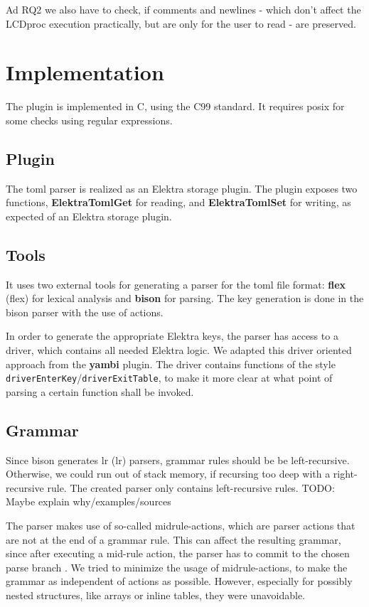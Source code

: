 \documentclass[draft,final]{vutinfth} %
\begin{document}
Ad RQ2 we also have to check, if comments and newlines - which don't affect the LCDproc execution practically, but are only for the user to read - are preserved.

\chapter{Implementation}

The plugin is implemented in C, using the C99 standard. It requires \acrshort{posix} for some checks using regular expressions.

\section{Plugin}
The \acrshort{toml} parser is realized as an Elektra storage plugin. The plugin exposes two functions, \textbf{ElektraTomlGet} for reading, and \textbf{ElektraTomlSet} for writing, as expected of an Elektra storage plugin.

\section{Tools}
It uses two external tools for generating a parser for the toml file format: \textbf{\acrshort{flex}} (\acrlong{flex}) \cite{flexgit} for lexical analysis and \textbf{bison} \cite{bisonmain} for parsing.
The key generation is done in the bison parser with the use of actions.

In order to generate the appropriate Elektra keys, the parser has access to a driver, which contains all needed Elektra logic.
We adapted this driver oriented approach from the \textbf{yambi}\cite{Elektrayambi} plugin.
The driver contains functions of the style \texttt{driverEnterKey}/\texttt{driverExitTable}, to make it more clear at what point of parsing a certain function shall be invoked.

\section{Grammar}
Since bison generates \acrshort{lr} (\acrlong{lr}) parsers, grammar rules should be be left-recursive.
Otherwise, we could run out of stack memory, if recursing too deep with a right-recursive rule.
The created parser only contains left-recursive rules.
TODO: Maybe explain why/examples/sources

The parser makes use of so-called midrule-actions, which are parser actions that are not at the end of a grammar rule.
This can affect the resulting grammar, since after executing a mid-rule action, the parser has to commit to the chosen parse branch \cite{bisonmidruleconflicts}.
We tried to minimize the usage of midrule-actions, to make the grammar as independent of actions as possible.
However, especially for possibly nested structures, like arrays or inline tables, they were unavoidable.
\end{document}
